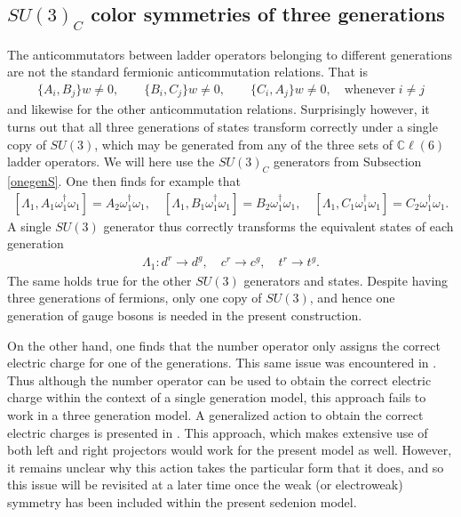 \documentclass{article}
\newcommand{\bb}[1]{\mathbb{#1}}
\begin{document}
\subsection{$SU(3)_C$ color symmetries of three generations}

The anticommutators between ladder operators belonging to different generations are not the standard fermionic anticommutation relations. That is
\begin{eqnarray}
    \{A_i,B_j\}w\neq 0,\qquad \{B_i,C_j\}w\neq 0,\qquad \{C_i,A_j\}w\neq 0, \quad\textrm{whenever}\;i\neq j
\end{eqnarray}
and likewise for the other anticommutation relations. Surprisingly however, it turns out that all three generations of states transform correctly under a single copy of $SU(3)$, which may be generated from any of the three sets of $\bb{C}\ell(6)$ ladder operators. We will here use the $SU(3)_C$ generators from Subsection \ref{onegenS}. One then finds for example that
\begin{eqnarray}
    \left[\Lambda_1, {A_1}\omega_1^\dagger\omega_1 \right]= {A_2}\omega_1^\dagger\omega_1,\quad
    \left[\Lambda_1, {B_1}\omega_1^\dagger\omega_1 \right]= {B_2}\omega_1^\dagger\omega_1,\quad
    \left[\Lambda_1, {C_1}\omega_1^\dagger\omega_1 \right]= {C_2}\omega_1^\dagger\omega_1.
\end{eqnarray}
A single $SU(3)$ generator thus correctly transforms the equivalent states of each generation
\begin{eqnarray}
    \Lambda_1: d^r\rightarrow d^g,\quad c^r\rightarrow c^g,\quad t^r\rightarrow t^g.
\end{eqnarray}
The same holds true for the other $SU(3)$ generators and states. Despite having three generations of fermions, only one copy of $SU(3)$, and hence one generation of gauge bosons is needed in the present construction. 

On the other hand, one finds that the number operator only assigns the correct electric charge for one of the generations. This same issue was encountered in \cite{furey2014generations}. Thus although the number operator can be used to obtain the correct electric charge within the context of a single generation model, this approach fails to work in a three generation model.  A generalized action to obtain the correct electric charges is presented in \cite{furey2018three}. This approach, which makes extensive use of both left and right projectors would work for the present model as well. However, it remains unclear why this action takes the particular form that it does, and so this issue will be revisited at a later time once the weak (or electroweak) symmetry has been included within the present sedenion model.
\end{document}
